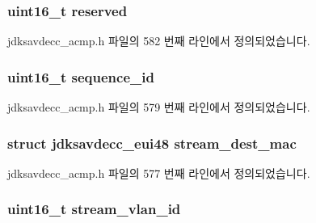 \subsubsection[{\texorpdfstring{reserved}{reserved}}]{\setlength{\rightskip}{0pt plus 5cm}uint16\+\_\+t reserved}\hypertarget{structjdksavdecc__acmpdu_a5a6ed8c04a3db86066924b1a1bf4dad3}{}\label{structjdksavdecc__acmpdu_a5a6ed8c04a3db86066924b1a1bf4dad3}


jdksavdecc\+\_\+acmp.\+h 파일의 582 번째 라인에서 정의되었습니다.

\subsubsection[{\texorpdfstring{sequence\+\_\+id}{sequence_id}}]{\setlength{\rightskip}{0pt plus 5cm}uint16\+\_\+t sequence\+\_\+id}\hypertarget{structjdksavdecc__acmpdu_a8f184eb7c16a6d3a501c383ee8ffa200}{}\label{structjdksavdecc__acmpdu_a8f184eb7c16a6d3a501c383ee8ffa200}


jdksavdecc\+\_\+acmp.\+h 파일의 579 번째 라인에서 정의되었습니다.

\subsubsection[{\texorpdfstring{stream\+\_\+dest\+\_\+mac}{stream_dest_mac}}]{\setlength{\rightskip}{0pt plus 5cm}struct {\bf jdksavdecc\+\_\+eui48} stream\+\_\+dest\+\_\+mac}\hypertarget{structjdksavdecc__acmpdu_acb9f6beb748e2b0e9086f809a4b3143d}{}\label{structjdksavdecc__acmpdu_acb9f6beb748e2b0e9086f809a4b3143d}


jdksavdecc\+\_\+acmp.\+h 파일의 577 번째 라인에서 정의되었습니다.

\subsubsection[{\texorpdfstring{stream\+\_\+vlan\+\_\+id}{stream_vlan_id}}]{\setlength{\rightskip}{0pt plus 5cm}uint16\+\_\+t stream\+\_\+vlan\+\_\+id}\hypertarget{structjdksavdecc__acmpdu_a8901fae0712dfce7341cdcbe8b43035c}{}\label{structjdksavdecc__acmpdu_a8901fae0712dfce7341cdcbe8b43035c}


